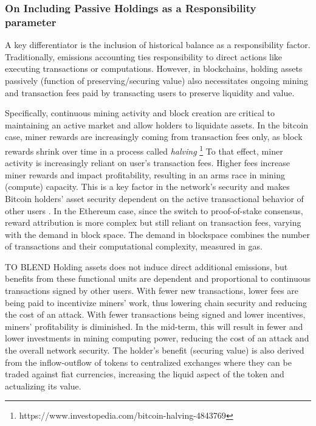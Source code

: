 \documentclass[11pt]{report}
\begin{document}
\subsubsection*{On Including Passive Holdings as a Responsibility parameter}
A key differentiator is the inclusion of historical balance as a responsibility factor. Traditionally, emissions accounting ties responsibility to direct actions like executing transactions or computations.  However, in blockchains, holding assets passively (function of preserving/securing value) also necessitates ongoing mining and transaction fees paid by transacting users to preserve liquidity and value.


Specifically, continuous mining activity and block creation are critical to maintaining an active market and allow holders to liquidate assets. In the bitcoin case, miner rewards are increasingly coming from transaction fees only, as block rewards shrink over time in a process called \textit{halving} \footnote{https://www.investopedia.com/bitcoin-halving-4843769} To that effect, miner activity is increasingly reliant on user's transaction fees. Higher fees increase miner rewards and impact profitability, resulting in an arms race in mining (compute) capacity. This is a key factor in the network's security and makes Bitcoin holders' asset security dependent on the active transactional behavior of other users \cite{easleyMiningMarketsEvolution2019}. In the Ethereum case, since the switch to proof-of-stake consensus, reward attribution is more complex but still reliant on transaction fees, varying with the demand in block space. The demand in blockspace combines the number of transactions and their computational complexity, measured in gas.

TO BLEND
Holding assets does not induce direct additional emissions, but benefits from these functional units are dependent and proportional to continuous transactions signed by other users. With fewer new transactions, lower fees are being paid to incentivize miners' work, thus lowering chain security and reducing the cost of an attack. With fewer transactions being signed and lower incentives, miners' profitability is diminished.  In the mid-term, this will result in fewer and lower investments in mining computing power, reducing the cost of an attack and the overall network security. The holder's benefit (securing value) is also derived from the inflow-outflow of tokens to centralized exchanges where they can be traded against fiat currencies, increasing the liquid aspect of the token and actualizing its value. 
\end{document}
